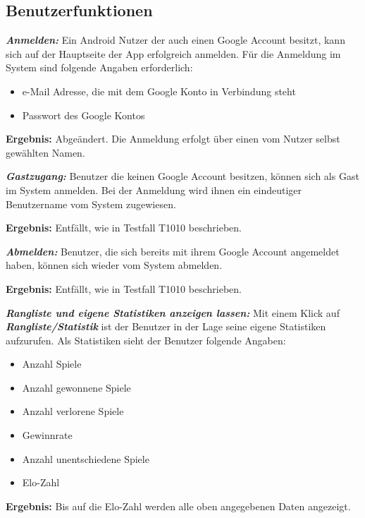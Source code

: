 \documentclass[parskip=full]{scrartcl}
\begin{document}
\subsection{Benutzerfunktionen}
\begin{description}
	\item[F1010] \textbf{\textit{Anmelden: }} Ein Android Nutzer der auch einen Google Account besitzt, kann sich auf der Hauptseite der App erfolgreich anmelden. Für die Anmeldung im System sind folgende Angaben erforderlich:
	\begin{itemize}
		\item e-Mail Adresse, die mit dem Google Konto in Verbindung steht
		\item Passwort des Google Kontos
	\end{itemize}  
	\item \textbf{Ergebnis: } Abgeändert. Die Anmeldung erfolgt über einen vom Nutzer selbst gewählten Namen.

	\item[F1020] \textbf{\textit{Gastzugang: }} Benutzer die keinen Google Account besitzen, können sich als Gast im System anmelden. Bei der Anmeldung wird ihnen ein eindeutiger Benutzername vom System zugewiesen.
	\item \textbf{Ergebnis: } Entfällt, wie in Testfall T1010 beschrieben.
	
	\item[F1030] \textbf{\textit{Abmelden: }} Benutzer, die sich bereits mit ihrem Google Account angemeldet haben, können sich wieder vom System abmelden.
	\item \textbf{Ergebnis: } Entfällt, wie in Testfall T1010 beschrieben.
	
	
	\item [F1040] \textbf{\textit{Rangliste und eigene Statistiken anzeigen lassen: }} Mit einem Klick auf \textbf{\textit{Rangliste/Statistik }} ist der Benutzer in der Lage seine eigene Statistiken aufzurufen. Als Statistiken sieht der Benutzer folgende Angaben:
	
	\begin{itemize}
		\item Anzahl Spiele
		\item Anzahl gewonnene Spiele
		\item Anzahl verlorene Spiele
		\item Gewinnrate
		\item Anzahl unentschiedene Spiele
		\item Elo-Zahl		
	\end{itemize}
	\item \textbf{Ergebnis: } Bis auf die Elo-Zahl werden alle oben angegebenen Daten angezeigt.
	

\end{description}
\end{document}
